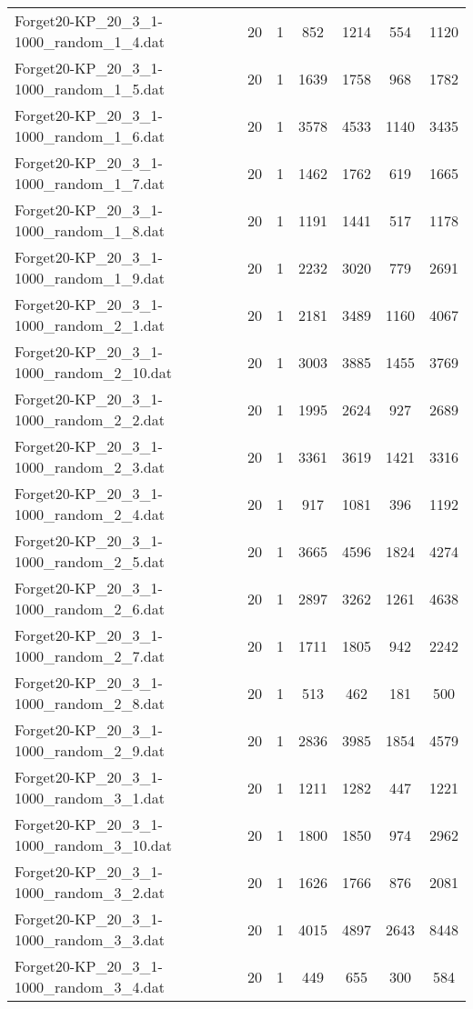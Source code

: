 \begin{table}[!ht]
\begin{tabular}{lcccccc}
Forget20-KP\_20\_3\_1-1000\_random\_1\_4.dat & 20 & 1 & 852 & 1214 & 554 & 1120 \\
Forget20-KP\_20\_3\_1-1000\_random\_1\_5.dat & 20 & 1 & 1639 & 1758 & 968 & 1782 \\
Forget20-KP\_20\_3\_1-1000\_random\_1\_6.dat & 20 & 1 & 3578 & 4533 & 1140 & 3435 \\
Forget20-KP\_20\_3\_1-1000\_random\_1\_7.dat & 20 & 1 & 1462 & 1762 & 619 & 1665 \\
Forget20-KP\_20\_3\_1-1000\_random\_1\_8.dat & 20 & 1 & 1191 & 1441 & 517 & 1178 \\
Forget20-KP\_20\_3\_1-1000\_random\_1\_9.dat & 20 & 1 & 2232 & 3020 & 779 & 2691 \\
Forget20-KP\_20\_3\_1-1000\_random\_2\_1.dat & 20 & 1 & 2181 & 3489 & 1160 & 4067 \\
Forget20-KP\_20\_3\_1-1000\_random\_2\_10.dat & 20 & 1 & 3003 & 3885 & 1455 & 3769 \\
Forget20-KP\_20\_3\_1-1000\_random\_2\_2.dat & 20 & 1 & 1995 & 2624 & 927 & 2689 \\
Forget20-KP\_20\_3\_1-1000\_random\_2\_3.dat & 20 & 1 & 3361 & 3619 & 1421 & 3316 \\
Forget20-KP\_20\_3\_1-1000\_random\_2\_4.dat & 20 & 1 & 917 & 1081 & 396 & 1192 \\
Forget20-KP\_20\_3\_1-1000\_random\_2\_5.dat & 20 & 1 & 3665 & 4596 & 1824 & 4274 \\
Forget20-KP\_20\_3\_1-1000\_random\_2\_6.dat & 20 & 1 & 2897 & 3262 & 1261 & 4638 \\
Forget20-KP\_20\_3\_1-1000\_random\_2\_7.dat & 20 & 1 & 1711 & 1805 & 942 & 2242 \\
Forget20-KP\_20\_3\_1-1000\_random\_2\_8.dat & 20 & 1 & 513 & 462 & 181 & 500 \\
Forget20-KP\_20\_3\_1-1000\_random\_2\_9.dat & 20 & 1 & 2836 & 3985 & 1854 & 4579 \\
Forget20-KP\_20\_3\_1-1000\_random\_3\_1.dat & 20 & 1 & 1211 & 1282 & 447 & 1221 \\
Forget20-KP\_20\_3\_1-1000\_random\_3\_10.dat & 20 & 1 & 1800 & 1850 & 974 & 2962 \\
Forget20-KP\_20\_3\_1-1000\_random\_3\_2.dat & 20 & 1 & 1626 & 1766 & 876 & 2081 \\
Forget20-KP\_20\_3\_1-1000\_random\_3\_3.dat & 20 & 1 & 4015 & 4897 & 2643 & 8448 \\
Forget20-KP\_20\_3\_1-1000\_random\_3\_4.dat & 20 & 1 & 449 & 655 & 300 & 584 \\

\end{tabular}
\end{table}
